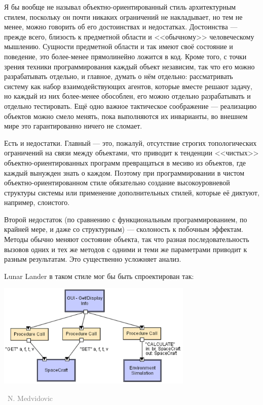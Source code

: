 \documentclass[a5paper]{article}
\newcommand{\attribution}[1] {
    \vspace{-4mm}\begin{flushright}\begin{scriptsize}\textcolor{gray}
    {\textcopyright\, #1}\end{scriptsize}\end{flushright}
}
\begin{document}
Я бы вообще не называл объектно-ориентированный стиль архитектурным стилем, поскольку он почти никаких ограничений не накладывает, но тем не менее, можно говорить об его достоинствах и недостатках. Достоинства --- прежде всего, близость к предметной области и <<обычному>> человеческому мышлению. Сущности предметной области и так имеют своё состояние и поведение, это более-менее прямолинейно ложится в код. Кроме того, с точки зрения техники программирования каждый объект независим, так что его можно разрабатывать отдельно, и главное, думать о нём отдельно: рассматривать систему как набор взаимодействующих агентов, которые вместе решают задачу, но каждый из них более-менее обособлен, его можно отдельно разрабатывать и отдельно тестировать. Ещё одно важное тактическое соображение --- реализацию объектов можно смело менять, пока выполняются их инварианты, во внешнем мире это гарантированно ничего не сломает.

Есть и недостатки. Главный --- это, пожалуй, отсутствие строгих топологических ограничений на связи между объектами, что приводит к тенденции <<чистых>> объектно-ориентированных программ превращаться в месиво из объектов, где каждый вынужден знать о каждом. Поэтому при программировании в чистом объектно-ориентированном стиле обязательно создание высокоуровневой структуры системы или применение дополнительных стилей, которые её диктуют, например, слоистого.

Второй недостаток (по сравнению с функциональным программированием, по крайней мере, и даже со структурным) --- сколоность к побочным эффектам. Методы обычно меняют состояние объекта, так что разная последовательность вызовов одних и тех же методов с одними и теми же параметрами приводит к разным результатам. Это существенно усложняет анализ.

Lunar Lander в таком стиле мог бы быть спроектирован так:

\begin{center}
    \includegraphics[width=0.7\textwidth]{objectOrientedLL.png}
    \attribution{N. Medvidovic}
\end{center}
\end{document}
